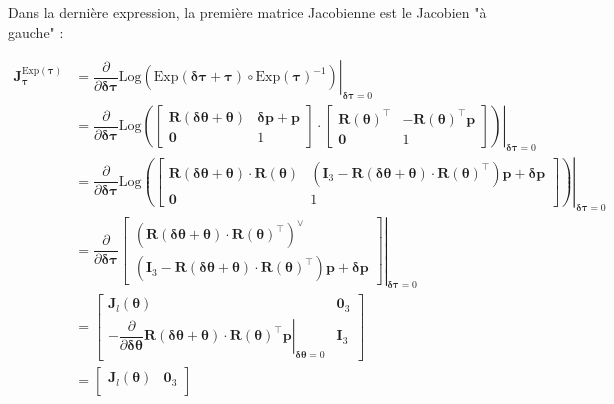 \documentclass[a4paper]{article}
\begin{document}
Dans la dernière expression, la première matrice Jacobienne est le Jacobien "à gauche" :

\begin{subequations}
\begin{align}
\bm{J}^{\text{Exp}(\bm{\tau})}_{\bm{\tau}} &=
\left.\dfrac{\partial}{\partial\bm{\delta\tau}}
\text{Log}\left( \text{Exp}(\bm{\delta\tau}+\bm{\tau}) \circ \text{Exp}(\bm{\tau})^{-1}
\right) \right|_{\bm{\delta\tau}=0}\\
%
&= \left.\dfrac{\partial}{\partial\bm{\delta\tau}}\text{Log}\left(
\begin{bmatrix} \bm{R}(\bm{\delta\theta} + \bm{\theta}) & \bm{\delta{p}}+ \bm{p} \\
\bm{0} & 1\end{bmatrix} \cdot \begin{bmatrix} \bm{R}(\bm{\theta})^{\top} & - 
\bm{R}(\bm{\theta})^{\top} \bm{p} \\ \bm{0} & 1\end{bmatrix}
\right)\right|_{\bm{\delta\tau}=0}\\
%
&= \left.\dfrac{\partial}{\partial\bm{\delta\tau}}\text{Log}\left(
\begin{bmatrix} \bm{R}(\bm{\delta\theta} + \bm{\theta}) \cdot \bm{R}(\bm{\theta}) &
\left( \bm{I}_3 - \bm{R}(\bm{\delta\theta}+\bm{\theta}) \cdot \bm{R}(\bm{\theta})^{\top} \right) \bm{p} + \bm{\delta{p}}\\ \bm{0} & 1\end{bmatrix}
\right)\right|_{\bm{\delta\tau}=0}\\
%
&= \left.\dfrac{\partial}{\partial\bm{\delta\tau}}
\begin{bmatrix} \left( \bm{R}(\bm{\delta\theta} + \bm{\theta}) \cdot \bm{R}(\bm{\theta})^{\top} 
\right)^{\vee} \\
\left( \bm{I}_3 - \bm{R}(\bm{\delta\theta}+\bm{\theta}) \cdot \bm{R}(\bm{\theta})^{\top} \right) \bm{p} + \bm{\delta{p}}\end{bmatrix}
\right|_{\bm{\delta\tau}=0}\\
%
&= \begin{bmatrix}
\bm{J}_l(\bm{\theta}) & \bm{0}_3 \\
- \left.\dfrac{\partial}{\partial\bm{\delta\theta}} 
\bm{R}(\bm{\delta\theta}+\bm{\theta}) \cdot \bm{R}(\bm{\theta})^{\top} \bm{p}
\right|_{\bm{\delta\theta}=0} & \bm{I}_3
\end{bmatrix}\\
%
&= \begin{bmatrix}
\bm{J}_l(\bm{\theta}) & \bm{0}_3 \\

\end{bmatrix}
\end{align}
\end{subequations}
\end{document}
